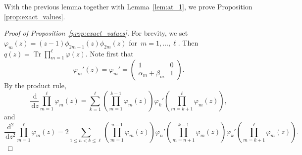 \documentclass[11pt]{article}
\theoremstyle{plain}
\theoremstyle{definition}
\numberwithin{equation}{section}
\renewcommand{\d}{\,\mathrm{d}}
\DeclareMathOperator{\Tr}{Tr}
\begin{document}
With the previous lemma together with Lemma~\ref{lem:at_1}, we prove Proposition \ref{prop:exact_values}. 
\begin{proof}[Proof of Proposition~\ref{prop:exact_values}]
For brevity, we set~$\varphi_m(z)=(z-1)\phi_{2m-1}(z)\phi_{2m}(z)$ for~$m=1,\dots,\ell$. Then~$q(z)=\Tr \prod_{m=1}^\ell \varphi(z)$. Note first that
\begin{equation}
\varphi_m'(z)=\varphi_m'=
\begin{pmatrix}
1 & 0 \\
\alpha_m+\beta_m & 1
\end{pmatrix}.
\end{equation}
By the product rule,
\begin{equation}\label{eq:prod_trace_1}
\frac{\d}{\d z}\prod_{m=1}^\ell \varphi_m(z)=\sum_{k=1}^\ell \left(\prod_{m=1}^{k-1} \varphi_m(z)\right) \varphi_k' \left(\prod_{m=k+1}^\ell \varphi_m(z)\right),
\end{equation} 
and
\begin{equation}\label{eq:prod_trace_2}
\frac{\d^2}{\d z^2}\prod_{m=1}^\ell \varphi_m(z)
=
2\sum_{1\leq n<k\leq \ell} \left(\prod_{m=1}^{n-1} \varphi_m(z)\right) \varphi_n'\left(\prod_{m=n+1}^{k-1} \varphi_m(z)\right) \varphi_k' \left(\prod_{m=k+1}^\ell \varphi_m(z)\right). 
\end{equation} 



\end{proof}
\end{document}
